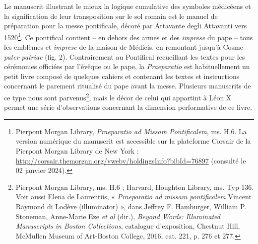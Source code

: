 \documentclass[12pt,twoside,openany]{book}
\begin{document}
Le manuscrit illustrant le mieux la logique cumulative des symboles médicéens et la signification de leur transposition sur le sol romain est le manuel de préparation pour la messe pontificale, décoré par Attavante degli Attavanti vers 1520\footnote{Pierpont Morgan Library, \textit{Praeparatio ad Missam Pontificalem}, ms. H.6. La version numérique du manuscrit est accessible sur la plateforme Corsair de la Pierpont Morgan Library de New York : \href{http://corsair.themorgan.org/vwebv/holdingsInfo?bibId=76897}{http://corsair.themorgan.org/vwebv/holdingsInfo?bibId=76897} (consulté le 02 janvier 2024).}. Ce pontifical contient – en dehors des armes et des \textit{imprese} du pape – tous les emblèmes et \textit{imprese} de la maison de Médicis, en remontant jusqu’à Cosme \textit{pater patriae }(fig. 2). Contrairement au Pontifical recueillant les textes pour les cérémonies officiées par l’évêque ou le pape, la \textit{Praeparatio }est habituellement un petit livre composé de quelques cahiers et contenant les textes et instructions concernant le parement ritualisé du pape avant la messe. Plusieurs manuscrits de ce type nous sont parvenus\footnote{Pierpont Morgan Library, ms. H.6 ; Harvard, Houghton Library, ms. Typ 136. Voir aussi Elena de Laurentiis, « \textit{Praeparatio ad missam pontificalem }Vincent Raymond di Lodève (illuminator) », dans Jeffrey F. Hamburger, William P. Stoneman, Anne-Marie Eze \textit{et al} (dir.), \textit{Beyond Words: Illuminated Manuscripts in Boston Collections}, catalogue d’exposition, Chestnut Hill, McMullen Museum of Art-Boston College, 2016, cat. 221, p. 276 et 277.}, mais le décor de celui qui appartint à Léon X permet une série d’observations concernant la dimension performative de ce livre.
\end{document}
